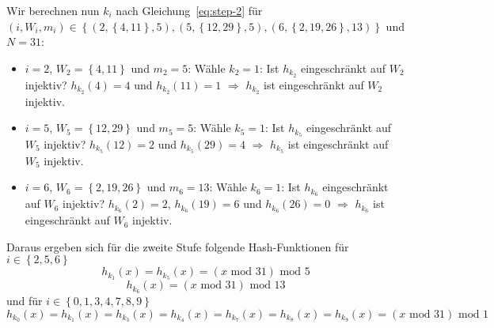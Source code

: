\documentclass{article}
\begin{document}
Wir berechnen nun $k_i$ nach Gleichung~\ref{eq:step-2} f{\"u}r
$\left( i, W_i, m_i \right) \in \left\{ \left( 2, \left\{ 4, 11 \right\}, 5 \right), \left( 5, \left\{ 12, 29 \right\}, 5 \right), \left( 6, \left\{ 2, 19, 26 \right\}, 13 \right) \right\}$
und $N = 31$:
\parskip0pt\begin{itemize}
  \item $i = 2$, $W_2 = \left\{ 4, 11 \right\}$ und $m_2 = 5$: \newline
    W{\"a}hle $k_2 = 1$: Ist $h_{k_2}$ eingeschr{\"a}nkt auf $W_2$ injektiv?
    \newline $h_{k_2} \left( 4 \right) = 4$ und $h_{k_2} \left( 11 \right) = 1$
    $\Rightarrow$ $h_{k_2}$ ist eingeschr{\"a}nkt auf $W_2$ injektiv.
  \item $i = 5$, $W_5 = \left\{ 12, 29 \right\}$ und $m_5 = 5$: \newline
    W{\"a}hle $k_5 = 1$: Ist $h_{k_5}$ eingeschr{\"a}nkt auf $W_5$ injektiv?
    \newline $h_{k_5} \left( 12 \right) = 2$ und $h_{k_5} \left( 29 \right) = 4$
    $\Rightarrow$ $h_{k_5}$ ist eingeschr{\"a}nkt auf $W_5$ injektiv.
  \item $i = 6$, $W_6 = \left\{ 2, 19, 26 \right\}$ und $m_6 = 13$: \newline
    W{\"a}hle $k_6 = 1$: Ist $h_{k_6}$ eingeschr{\"a}nkt auf $W_6$ injektiv?
    \newline $h_{k_6} \left( 2 \right) = 2$, $h_{k_6} \left( 19 \right) = 6$ und
    $h_{k_6} \left( 26 \right) = 0$ $\Rightarrow$ $h_{k_6}$ ist eingeschr{\"a}nkt
    auf $W_6$ injektiv.
\end{itemize}

Daraus ergeben sich f{\"u}r die zweite Stufe folgende Hash-Funktionen f{\"u}r
$i \in \left\{ 2, 5, 6 \right\}$
\begin{equation}
  h_{k_1} \left( x \right) = h_{k_5} \left( x \right) = \left( x\text{ mod }31 \right)\text{ mod }5
  \label{eq:hk1}
\end{equation}
\begin{equation}
  h_{k_6} \left( x \right) = \left( x\text{ mod }31 \right)\text{ mod }13
\end{equation}
und f{\"u}r $i \in \left\{ 0, 1, 3, 4, 7, 8, 9 \right\}$
\begin{equation}
  h_{k_0} \left( x \right) = h_{k_1} \left( x \right) = h_{k_3} \left( x \right) = h_{k_4} \left( x \right) = h_{k_7} \left( x \right) = h_{k_8} \left( x \right) = h_{k_9} \left( x \right) = \left( x\text{ mod }31 \right)\text{ mod }1
  \label{eq:hki}
\end{equation}
\end{document}
